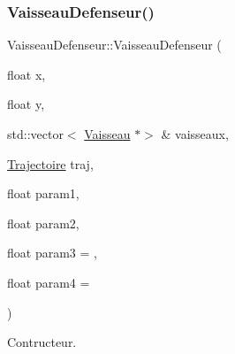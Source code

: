 \subsubsection{\texorpdfstring{Vaisseau\+Defenseur()}{VaisseauDefenseur()}}
{\footnotesize\ttfamily Vaisseau\+Defenseur\+::\+Vaisseau\+Defenseur (\begin{DoxyParamCaption}\item[{float}]{x,  }\item[{float}]{y,  }\item[{std\+::vector$<$ \hyperlink{class_vaisseau}{Vaisseau} $\ast$$>$ \&}]{vaisseaux,  }\item[{\hyperlink{_trajectoire_8h_afa7f6e8323d7ee755d93cd1f6019dd95}{Trajectoire}}]{traj,  }\item[{float}]{param1,  }\item[{float}]{param2,  }\item[{float}]{param3 = {},  }\item[{float}]{param4 = {} }\end{DoxyParamCaption})}



Contructeur. 


